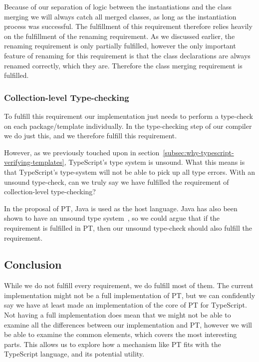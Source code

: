 Because of our separation of logic between the instantiations and the class merging we will always catch all merged classes, as long as the instantiation process was successful.
The fulfillment of this requirement therefore relies heavily on the fulfillment of the renaming requirement.
As we discussed earlier, the renaming requirement is only partially fulfilled, however the only important feature of renaming for this requirement is that the class declarations are always renamed correctly, which they are.
Therefore the class merging requirement is fulfilled.

\subsubsection{Collection-level Type-checking}\label{subsubsec:implementation-collection-level-type-checking}

To fulfill this requirement our implementation just needs to perform a type-check on each package/template individually.
In the type-checking step of our compiler we do just this, and we therefore fulfill this requirement.

However, as we previously touched upon in section~\vref{subsec:why-typescript-verifying-templates}, TypeScript's type system is unsound.
What this means is that TypeScript's type-system will not be able to pick up all type errors.
With an unsound type-check, can we truly say we have fulfilled the requirement of collection-level type-checking?

In the proposal of PT, Java is used as the host language.
Java has also been shown to have an unsound type system~\cite{java-unsound}, so we could argue that if the requirement is fulfilled in PT, then our unsound type-check should also fulfill the requirement.

\subsection{Conclusion}\label{subsec:requirements-conclusion}

While we do not fulfill every requirement, we do fulfill most of them.
The current implementation might not be a full implementation of PT, but we can confidently say we have at least made an implementation of the core of PT for TypeScript.
Not having a full implementation does mean that we might not be able to examine all the differences between our implementation and PT, however we will be able to examine the common elements, which covers the most interesting parts.
This allows us to explore how a mechanism like PT fits with the TypeScript language, and its potential utility.